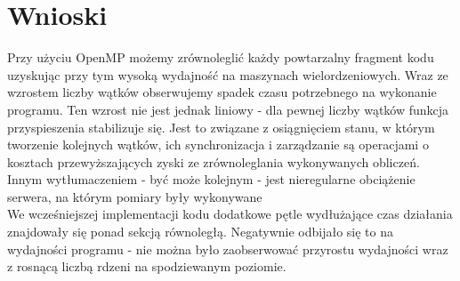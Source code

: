 \documentclass[a4paper,12pt]{article}
\begin{document}
\section*{Wnioski}
Przy użyciu OpenMP możemy zrównoleglić każdy powtarzalny fragment kodu uzyskując przy tym wysoką wydajność na maszynach wielordzeniowych. 
Wraz ze wzrostem liczby wątków obserwujemy spadek czasu potrzebnego na wykonanie programu. Ten wzrost nie jest jednak liniowy - dla pewnej liczby wątków funkcja przyspieszenia stabilizuje się. Jest to związane z osiągnięciem stanu, w którym tworzenie kolejnych wątków, ich synchronizacja i zarządzanie są operacjami o kosztach przewyższających zyski ze zrównoleglania wykonywanych obliczeń.
Innym wytłumaczeniem - być może kolejnym - jest nieregularne obciążenie serwera, na którym pomiary były wykonywane
\\
We wcześniejszej implementacji kodu dodatkowe pętle wydłużające czas działania znajdowały się ponad sekcją równoległą. Negatywnie odbijało się to na wydajności programu - nie można było zaobserwować przyrostu wydajności wraz z rosnącą liczbą rdzeni na spodziewanym poziomie.
\end{document}
